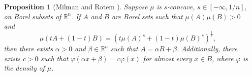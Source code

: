 \documentclass[11pt]{amsart}
\newtheorem{lemma}[theorem]{Lemma}
\newtheorem{proposition}[theorem]{Proposition}
\theoremstyle{definition}
\theoremstyle{remark}
\numberwithin{equation}{section}
\newcommand{\R}{\mathbb{R}}
\begin{document}
	\begin{proposition}[Milman and Rotem \cite{MR14}]
	\label{p:mr}
	Suppose $\mu$ is $s$-concave, $s\in [-\infty,1/n]$, on Borel subsets of $\R^n$. If $A$ and $B$ are Borel sets such that $\mu(A)\mu(B) >0$ and
		$$\mu(t A +(1-t)B) = \left(t\mu(A)^s +(1-t)\mu(B)^{s}\right)^{\frac{1}{s}},$$
	then there exists $\alpha >0$ and $\beta\in \R^n$ such that $A=\alpha B + \beta$. Additionally, there exists $c>0$ such that $\varphi(\alpha x+\beta)=c\varphi(x)$ for almost every $x\in B$, where $\varphi$ is the density of $\mu$.
	\end{proposition}
\end{document}
